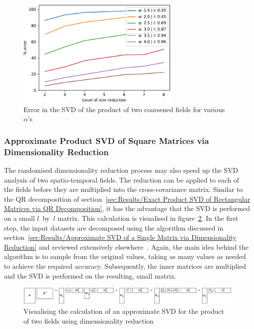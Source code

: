 \documentclass[ijgi,article,submit,moreauthors,pdftex,10pt,a4paper]{Definitions/mdpi}
\begin{document}
\begin{figure}[H]
\centering
\includegraphics[width=80mm]{Results/plotProductSpatialTemporalFieldsViaCoarsening.pdf}
\caption[Error after coarsening]{Error in the SVD of the product of two coarsened fields for various $\alpha$'s}
\label{fig:plotProductSpatialTemporalFieldsViaCoarsening}
\end{figure}

\subsubsection{Approximate Product SVD of Square Matrices via Dimensionality Reduction}
\label{sec:Results/Approximate Product SVD of Square Matrices via Dimensionality Reduction}

The randomised dimensionality reduction process may also speed up the SVD analysis of two spatio-temporal fields. The reduction can be applied to each of the fields before they are multiplied into the cross-covariance matrix. Similar to the QR decomposition of section~\ref{sec:Results/Exact Product SVD of Rectangular Matrices via QR Decomposition}, it has the advantage that the SVD is performed on a small $l$~by~$l$ matrix. This calculation is visualised in figure~\ref{fig:randomisedSquareProductSVD}. In the first step, the input datasets are decomposed using the algorithm discussed in section~\ref{sec:Results/Approximate SVD of a Single Matrix via Dimensionality Reduction} and reviewed extensively elsewhere~\cite{Halko2011, Li2016}. Again, the main idea behind the algorithm is to sample from the original values, taking as many values as needed to achieve the required accuracy. Subsequently, the inner matrices are multiplied and the SVD is performed on the resulting, small matrix.

\begin{figure}[H]
\centering
\includegraphics[width=\textwidth]{Results/randomisedSquareProductSVD.pdf}
\caption[Approximate product SVD]{Visualising the calculation of an approximate SVD for the product of two fields using dimensionality reduction}
\label{fig:randomisedSquareProductSVD}
\end{figure}
\end{document}
